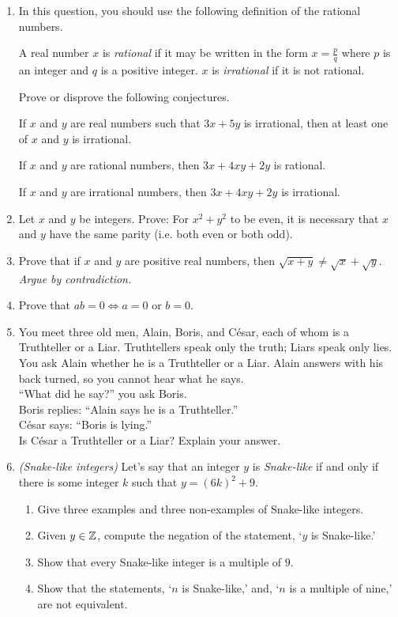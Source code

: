 \begin{exercises}{}{}
\begin{enumerate}
	\item In this question, you should use the following definition of the rational numbers.
		\begin{defn*}{}{}
  	A real number $x$ is \emph{rational} if it may be written in the form $x=\frac pq$ where $p$ is an integer and $q$ is a positive integer. $x$ is \emph{irrational} if it is not rational.
  	\end{defn*}
  	Prove or disprove the following conjectures.
  	\begin{conj*}{1}{}
			If $x$ and $y$ are real numbers such that $3x+5y$ is irrational, then at least one of $x$ and $y$ is irrational.
		\end{conj*}
  	\begin{conj*}{2}{}
			If $x$ and $y$ are rational numbers, then $3x+4xy+2y$ is rational.
		\end{conj*}
  	\begin{conj*}{3}{}
			If $x$ and $y$ are irrational numbers, then $3x+4xy+2y$ is irrational.
		\end{conj*}
	
	\item Let $x$ and $y$ be integers. Prove: For $x^2+y^2$ to be even, it is necessary that $x$ and $y$ have the same parity (i.e. both even or both odd).
 
	\item Prove that if $x$ and $y$ are positive real numbers, then $\sqrt{x+y}\neq\sqrt{x}+\sqrt{y}$. \emph{Argue by contradiction.}
	
	\item Prove that $ab=0\iff a=0$ or $b=0$.

  \item You meet three old men, Alain, Boris, and César, each of whom is a Truthteller or a Liar. Truthtellers speak only the truth; Liars speak only lies. You ask Alain whether he is a Truthteller or a Liar. Alain answers with his back turned, so you cannot hear what he says.\\[5pt]
``What did he say?'' you ask Boris.\\[5pt]
Boris replies: ``Alain says he is a Truthteller.''\\[5pt]
César says: ``Boris is lying.''\\[5pt]
Is César a Truthteller or a Liar? Explain your answer.\goodbreak
	
  \item \emph{(Snake-like integers)} Let's say that an integer $y$ is \textit{Snake-like} if and only if there is some integer $k$ such that $y=(6k)^2+9$.
	\begin{enumerate}
	  \item Give three examples and three non-examples of Snake-like integers. 
	  \item Given $y\in\mathbb{Z}$, compute the negation of the statement, `$y$ is Snake-like.'
	  \item Show that every Snake-like integer is a multiple of $9$.
	  \item Show that the statements, `$n$ is Snake-like,' and, `$n$ is a multiple of nine,' are not equivalent.
	\end{enumerate}
	

\end{enumerate}
\end{exercises}
